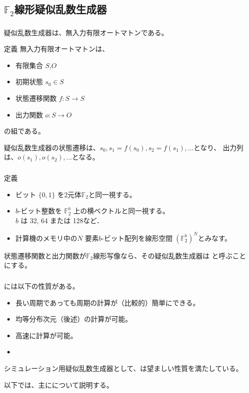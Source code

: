 \documentclass[cjk, dvips, handout, trans, xcolor=dvipsnames]{beamer}
\def\F2{{\mathbb F}_2}
\begin{document}
\subsection{$\F2$線形疑似乱数生成器}
\begin{frame}[t]
  \frametitle{\insertsubsection}
  疑似乱数生成器は、無入力有限オートマトンである。
  \begin{block}{定義}
    無入力有限オートマトンは、
    \begin{itemize}
    \item 有限集合 $S$,$O$
    \item 初期状態 $s_0 \in S$
    \item 状態遷移関数 $f: S \longrightarrow S$
    \item 出力関数 $o: S \longrightarrow O$
    \end{itemize}
    の組である。
  \end{block}
  疑似乱数生成器の状態遷移は、$s_0, s_1 = f(s_0), s_2 = f(s_1), ...$となり、
  出力列は、$o(s_1), o(s_2), ...$となる。
\end{frame}

\begin{frame}[t]
  \frametitle{\insertsubsection}
  \begin{block}{定義}
    \begin{itemize}
    \item ビット $\{0,1\}$ を2元体$\F2$と同一視する。
    \item $b$-ビット整数を $\F2^{b}$ 上の横ベクトルと同一視する。 \\
      $b$ は 32, 64 または 128など．
    \item 計算機のメモリ中の$N$ 要素$b$-ビット配列を線形空間 $(\F2^{b})^N$とみなす。
    \end{itemize}
  \end{block}

  状態遷移関数と出力関数が$\F2$線形写像なら、その疑似乱数生成器は
  \strong{\FLPRNG}と呼ぶことにする。
\end{frame}

\begin{frame}[t]
  \frametitle{\insertsubsection}

  \FLPRNG には以下の性質がある。
  \begin{itemize}
  \item 長い周期であっても周期の計算が（比較的）簡単にできる。
  \item 均等分布次元（後述）の計算が可能。
  \item 高速に計算が可能。
  \item {}
  \end{itemize}

  \pause
  シミュレーション用疑似乱数生成器として、\FLPRNG は望ましい性質を満たしている。

  以下では、主に\FLPRNG について説明する。
\end{frame}
\end{document}
